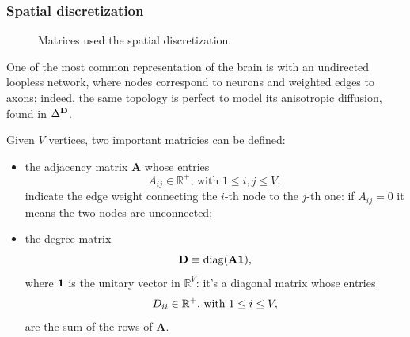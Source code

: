 \documentclass{article}
\begin{document}
            \subsubsection{Spatial discretization}\label{secSpatialDiscretization}

                \begin{figure}[t]
                    \centering
                    \resizebox{\textwidth}{!}{}
                    \caption{Matrices used the spatial discretization.}
                    \label{figMatricesLDA}
                \end{figure}

                One of the most common representation of the brain is with an undirected loopless network, where nodes correspond to neurons and weighted edges to axons; indeed, the same topology is perfect to model its anisotropic diffusion, found in $\Delta^{\mathbf D}$.

                Given $V$ vertices, two important matricies can be de\-fi\-ned:

                \begin{itemize}[%
                    topsep=7.5pt,     %
                    itemsep=-1pt,	  %
                    leftmargin=20pt,  %
                    rightmargin=0pt,  %
                ]
                    \item the adjacency matrix $\mathbf A$ whose entries \[A_{ij}\in\mathbb R^+\text{, with }1\le i,j\le V,\]indicate the edge weight connecting the $i$-th no\-de to the $j$-th one: if $A_{ij}=0$ it means the two nodes are unconnected;
                    \item the degree matrix \[\mathbf D\equiv\operatorname{diag}(\mathbf A\boldsymbol1),\]where $\boldsymbol1$ is the unitary vector in $\mathbb R^V$: it's a diagonal matrix whose en\-tries \[D_{ii}\in\mathbb R^+\text{, with }1\le i\le V,\]are the sum of the rows of $\mathbf A$.
                \end{itemize}
\end{document}
